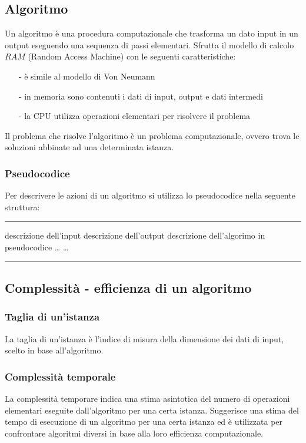 \documentclass[a4paper]{article}
\makeatletter
\newenvironment{algo}[4]{
	\noindent\rule{\textwidth}{0.4pt}
	\begin{algorithmic}[1]
		\addtocounter{ALG@line}{-1}
		\Procedure{#1}{#2}
		\Require #3
		\Ensure #4
		\Statex }{
		\EndProcedure
	\end{algorithmic}
	\rule{\textwidth}{0.4pt}}
\makeatother
\begin{document}
\subsection{Algoritmo}
Un algoritmo è una procedura computazionale che trasforma un dato input in un output eseguendo una sequenza di passi elementari.
Sfrutta il modello di calcolo \(RAM\) (Random Access Machine) con le seguenti caratteristiche:
\begin{itemize}[topsep=3pt, itemsep=0pt]
	\item[-] è simile al modello di Von Neumann
	\item[-] in memoria sono contenuti i dati di input, output e dati intermedi
	\item[-] la CPU utilizza operazioni elementari per risolvere il problema
\end{itemize}
Il problema che risolve l'algoritmo è un problema computazionale, ovvero trova le soluzioni abbinate ad una determinata istanza.

\subsubsection*{Pseudocodice}
Per descrivere le azioni di un algoritmo si utilizza lo pseudocodice nella seguente struttura:

\begin{algo}{MyAlgoritm}{parametri}{descrizione dell'input}{descrizione dell'output}
	\State descrizione dell'algorimo in pseudocodice
	\State \dots
	\State \dots
\end{algo}

\subsection{Complessità - efficienza di un algoritmo}
\subsubsection*{Taglia di un'istanza}
La taglia di un'istanza è l'indice di misura della dimensione dei dati di input, scelto in base all'algoritmo.

\subsubsection*{Complessità temporale}
La complessità temporare indica una stima asintotica del numero di operazioni elementari eseguite dall'algoritmo per una certa
istanza. Suggerisce una stima del tempo di esecuzione di un algoritmo per una certa istanza ed è utilizzata per confrontare
algoritmi diversi in base alla loro efficienza computazionale.
\end{document}
